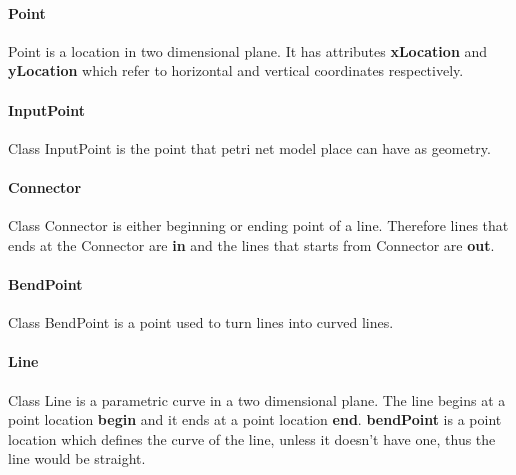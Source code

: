 \paragraph{Point}
Point is a location in two dimensional plane. It has attributes \textbf{xLocation} and \textbf{yLocation} which refer to horizontal and vertical coordinates respectively.

\paragraph{InputPoint}
Class InputPoint is the point that petri net model place can have as geometry.

\paragraph{Connector}
Class Connector is either beginning or ending point of a line. Therefore lines that ends at the Connector are \textbf{in} and the lines that starts from Connector are \textbf{out}.

\paragraph{BendPoint}
Class BendPoint is a point used to turn lines into curved lines.

\paragraph{Line}
Class Line is a parametric curve in a two dimensional plane. The line begins at a point location \textbf{begin} and it ends at a point location \textbf{end}. \textbf{bendPoint} is a point location which defines the curve of the line, unless it doesn't have one, thus the line would be straight.

